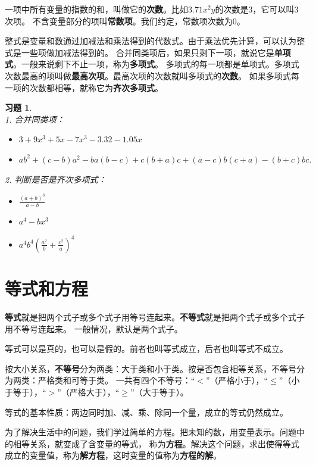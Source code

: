 \documentclass[12pt,UTF8]{ctexbook}
\newtheorem{xt}{习题}[section]
\begin{document}
一项中所有变量的指数的和，叫做它的\textbf{次数}。比如$3.71x^2y$的次数是$3$，它可以叫$3$次项。
不含变量部分的项叫\textbf{常数项}。我们约定，常数项次数为$0$。

整式是变量和数通过加减法和乘法得到的代数式。由于乘法优先计算，可以认为整式是一些项做加减法得到的。
合并同类项后，如果只剩下一项，就说它是\textbf{单项式}。一般来说剩下不止一项，称为\textbf{多项式}。
多项式的每一项都是单项式。多项式次数最高的项叫做\textbf{最高次项}。最高次项的次数就叫多项式的\textbf{次数}。
如果多项式每一项的次数都相等，就称它为\textbf{齐次多项式}。

\begin{xt}\label{xt:1-1-0}
    \mbox{} \\
    1. 合并同类项：\begin{itemize}
        \item $3 + 9x^3 + 5x - 7x^3 - 3.32 - 1.05x$
        \item $ab^2 + (c-b)a^2 - ba(b - c) + c(b + a)c + (a - c)b(c + a) - (b + c)bc.$
    \end{itemize}
    2. 判断是否是齐次多项式：\begin{itemize}
        \item $\frac{(a+b)^3}{a - b}$
        \item $a^4 - bx^3$
        \item $a^4b^4\left(\frac{a^2}{b} + \frac{c^2}{a}\right)^4$
    \end{itemize}
\end{xt}

\section{等式和方程}
\textbf{等式}就是把两个式子或多个式子用等号连起来。\textbf{不等式}就是把两个式子或多个式子用不等号连起来。
一般情况，默认是两个式子。

等式可以是真的，也可以是假的。前者也叫等式成立，后者也叫等式不成立。

按大小关系，\textbf{不等号}分为两类：大于类和小于类。按是否包含相等关系，不等号分为两类：严格类和可等于类。
一共有四个不等号：“$<$”（严格小于），“$\leqslant$”（小于等于），“$>$”（严格大于），“$\geqslant$”（大于等于）。

等式的基本性质：两边同时加、减、乘、除同一个量，成立的等式仍然成立。

为了解决生活中的问题，我们学过简单的方程。把未知的数，用变量表示。问题中的相等关系，就变成了含变量的等式，
称为\textbf{方程}。解决这个问题，求出使得等式成立的变量值，称为\textbf{解方程}，这时变量的值称为\textbf{方程的解}。
\end{document}
